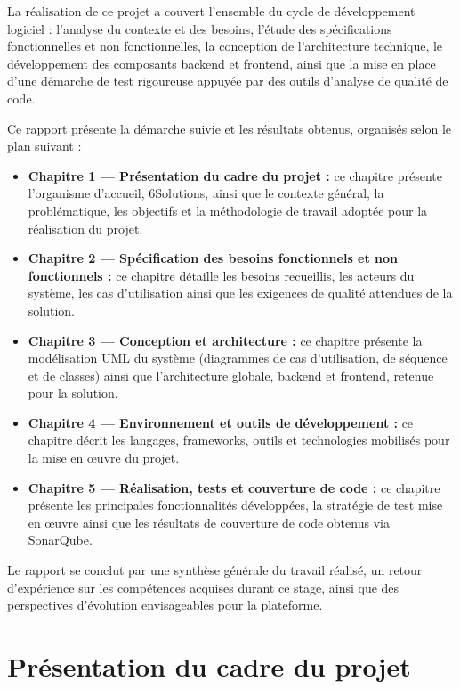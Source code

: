 \documentclass[12pt,a4paper]{report}
\begin{document}
La réalisation de ce projet a couvert l'ensemble du cycle de développement logiciel : l'analyse du contexte et des besoins, l'étude des spécifications fonctionnelles et non fonctionnelles, la conception de l'architecture technique, le développement des composants backend et frontend, ainsi que la mise en place d'une démarche de test rigoureuse appuyée par des outils d'analyse de qualité de code.

Ce rapport présente la démarche suivie et les résultats obtenus, organisés selon le plan suivant :

\begin{itemize}
  \item \textbf{Chapitre 1 --- Présentation du cadre du projet :} ce chapitre présente l'organisme d'accueil, 6Solutions, ainsi que le contexte général, la problématique, les objectifs et la méthodologie de travail adoptée pour la réalisation du projet.
  \item \textbf{Chapitre 2 --- Spécification des besoins fonctionnels et non fonctionnels :} ce chapitre détaille les besoins recueillis, les acteurs du système, les cas d'utilisation ainsi que les exigences de qualité attendues de la solution.
  \item \textbf{Chapitre 3 --- Conception et architecture :} ce chapitre présente la modélisation UML du système (diagrammes de cas d'utilisation, de séquence et de classes) ainsi que l'architecture globale, backend et frontend, retenue pour la solution.
  \item \textbf{Chapitre 4 --- Environnement et outils de développement :} ce chapitre décrit les langages, frameworks, outils et technologies mobilisés pour la mise en \oe uvre du projet.
  \item \textbf{Chapitre 5 --- Réalisation, tests et couverture de code :} ce chapitre présente les principales fonctionnalités développées, la stratégie de test mise en \oe uvre ainsi que les résultats de couverture de code obtenus via SonarQube.
\end{itemize}

Le rapport se conclut par une synthèse générale du travail réalisé, un retour d'expérience sur les compétences acquises durant ce stage, ainsi que des perspectives d'évolution envisageables pour la plateforme.

\chapter{Présentation du cadre du projet}
\end{document}
